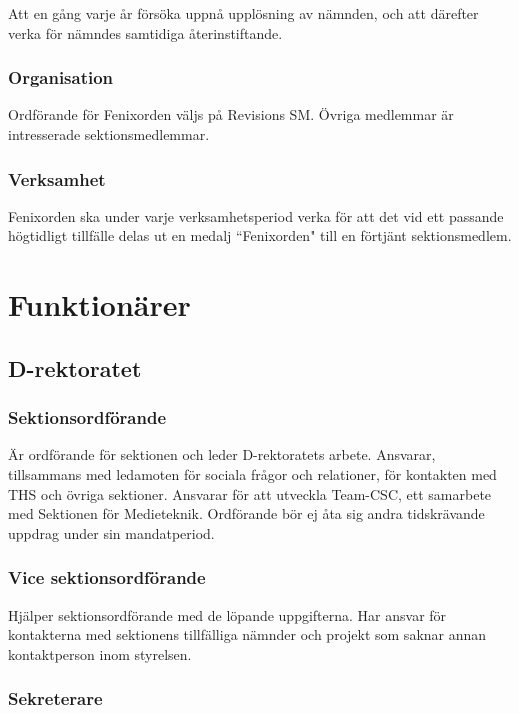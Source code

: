 \documentclass[a4paper,12pt]{article}
\begin{document}
Att en gång varje år försöka uppnå upplösning av nämnden, och att därefter verka för nämndes samtidiga återinstiftande.

\subsubsection{Organisation}

Ordförande för Fenixorden väljs på Revisions SM. Övriga medlemmar är intresserade sektionsmedlemmar.

\subsubsection{Verksamhet}

Fenixorden ska under varje verksamhetsperiod verka för att det vid ett passande högtidligt tillfälle delas ut en medalj ``Fenixorden" till en förtjänt sektionsmedlem.

\section{Funktionärer}

\subsection{D-rektoratet}

\subsubsection{Sektionsordförande}

Är ordförande för sektionen och leder D-rektoratets arbete. Ansvarar, tillsammans med ledamoten för sociala frågor och relationer, för kontakten med THS och övriga sektioner. Ansvarar för att utveckla Team-CSC, ett samarbete med Sektionen för Medieteknik. Ordförande bör ej åta sig andra tidskrävande uppdrag under sin mandatperiod.

\subsubsection{Vice sektionsordförande}

Hjälper sektionsordförande med de löpande uppgifterna. Har ansvar för kontakterna med sektionens tillfälliga nämnder och projekt som saknar annan kontaktperson inom styrelsen.

\subsubsection{Sekreterare}
\end{document}
